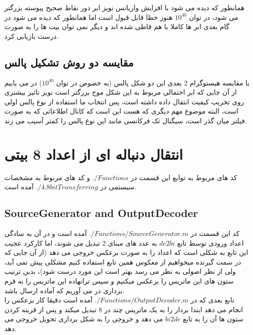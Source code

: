 \documentclass[a4paper,12pt]{article}
\begin{document}
همانطور که دیده می شود با افزایش واریانس نویز ابر دور نقاط صحیح پیوسته بزرگتر می شود، در توان $10^{40}$ هنوز خطا قابل قبول است اما همانطور که دیده می شود در گام بعدی ابر ها کاملا با هم قاطی شده اند و دیگر نمی توان بیت ها را به صورت درست بازیابی کرد.
\\
\subsection{مقایسه دو روش تشکیل پالس}
با مقایسه هیستوگرام 2 بعدی این دو شکل پالس (به خصوص در توان $10^{40}$) در می یابیم از آن جایی که ابر احتمالی مربوط به این شکل موج بزرگتر است نویز تاثیر بیشتری روی تخریب کیفیت انتقال داده داشته است، پس انتخاب ما استفاده از نوع پالس اولی است، البته موضوع مهم دیگری که هست این است که کانال اطلاعاتی که به صورت فیلتر میان گذر است، سیگنال تک فرکانسی مانند این نوع پالس را کمتر آسیب می زند.
\clearpage

\section{انتقال دنباله ای از اعداد 8 بیتی}
کد های مربوط به توابع این قسمت در $./Functions$ و کد های مربوط به مشخصات سیستمی در $./4.8bitTransferring$ آمده است.
\subsection{SourceGenerator and OutputDecoder}
کد این قسمت در $./Functions/SourceGenerator.m$ آمده است و در آن به سادگی اعداد ورودی توسط تابع $de2bi$ به عدد های مبنای 2 تبدیل می شوند، اما کارکرد عجیب این تابع به شکلی است که اعداد را به صورت برعکس خروجی می دهد (از آن جایی که در سمت گیرنده میخواهیم از معکوس همین تابع استفاده کنیم مشکلی پیش نمی آید، ولی از نظر اصولی به نظر می رسد بهتر است این مورد درست شود)، بدین ترتیب ستون های این ماتریس را برعکس میکنیم و سپس ترانهاده این ماتریس را به فرم برداری در می آوریم که آماده ارسال باشد.
\\
تابع بعدی که در $./Functions/OutputDecoder.m$ آمده است دقیقا کار برعکس را انجام می دهد ابتدا بردار را به یک ماتریس چند در 8 تبدیل میکند و پس از قرینه کردن ستون ها آن را به تابع $bi2de$ می دهد و خروجی را به شکل برداری تحویل خروجی می دهد.
\\
\end{document}
